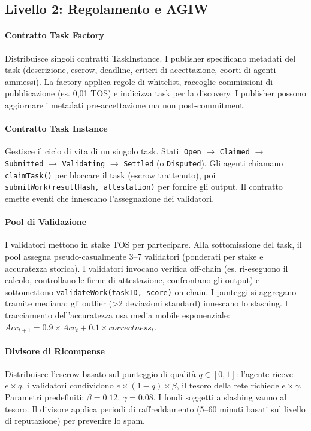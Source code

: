 \documentclass[11pt]{article}
\begin{document}
\subsection{Livello 2: Regolamento e AGIW}
\paragraph{Contratto Task Factory} Distribuisce singoli contratti TaskInstance. I publisher specificano metadati del task (descrizione, escrow, deadline, criteri di accettazione, coorti di agenti ammessi). La factory applica regole di whitelist, raccoglie commissioni di pubblicazione (es. 0,01 TOS) e indicizza task per la discovery. I publisher possono aggiornare i metadati pre-accettazione ma non post-commitment.

\paragraph{Contratto Task Instance} Gestisce il ciclo di vita di un singolo task. Stati: \texttt{Open} $\rightarrow$ \texttt{Claimed} $\rightarrow$ \texttt{Submitted} $\rightarrow$ \texttt{Validating} $\rightarrow$ \texttt{Settled} (o \texttt{Disputed}). Gli agenti chiamano \texttt{claimTask()} per bloccare il task (escrow trattenuto), poi \texttt{submitWork(resultHash, attestation)} per fornire gli output. Il contratto emette eventi che innescano l'assegnazione dei validatori.

\paragraph{Pool di Validazione} I validatori mettono in stake TOS per partecipare. Alla sottomissione del task, il pool assegna pseudo-casualmente 3--7 validatori (ponderati per stake e accuratezza storica). I validatori invocano verifica off-chain (es. ri-eseguono il calcolo, controllano le firme di attestazione, confrontano gli output) e sottomettono \texttt{validateWork(taskID, score)} on-chain. I punteggi si aggregano tramite mediana; gli outlier (>2 deviazioni standard) innescano lo slashing. Il tracciamento dell'accuratezza usa media mobile esponenziale: $Acc_{t+1} = 0.9 \times Acc_t + 0.1 \times correctness_t$.

\paragraph{Divisore di Ricompense} Distribuisce l'escrow basato sul punteggio di qualità $q \in [0,1]$: l'agente riceve $e \times q$, i validatori condividono $e \times (1-q) \times \beta$, il tesoro della rete richiede $e \times \gamma$. Parametri predefiniti: $\beta=0.12$, $\gamma=0.08$. I fondi soggetti a slashing vanno al tesoro. Il divisore applica periodi di raffreddamento (5--60 minuti basati sul livello di reputazione) per prevenire lo spam.
\end{document}
